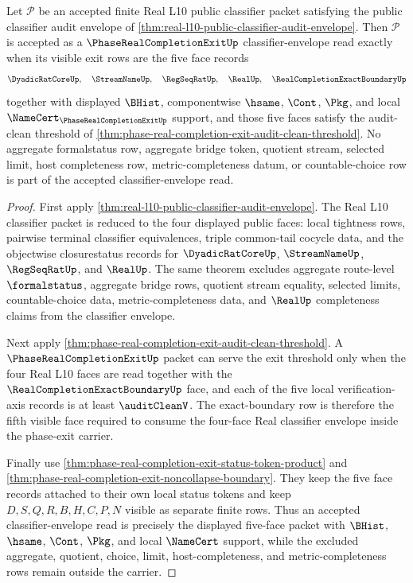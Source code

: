 \begin{theorem}
\label{thm:phase-real-completion-exit-classifier-envelope-admission}
Let $\mathcal P$ be an accepted finite Real L10 public classifier packet satisfying the public classifier audit envelope of \autoref{thm:real-l10-public-classifier-audit-envelope}. Then $\mathcal P$ is accepted as a $\PhaseRealCompletionExitUp$ classifier-envelope read exactly when its visible exit rows are the five face records
$$
\DyadicRatCoreUp,\quad \StreamNameUp,\quad \RegSeqRatUp,\quad \RealUp,\quad \RealCompletionExactBoundaryUp
$$
together with displayed $\BHist$, componentwise $\hsame$, $\Cont$, $\Pkg$, and local $\NameCert_{\PhaseRealCompletionExitUp}$ support, and those five faces satisfy the audit-clean threshold of \autoref{thm:phase-real-completion-exit-audit-clean-threshold}. No aggregate formalstatus row, aggregate bridge token, quotient stream, selected limit, host completeness row, metric-completeness datum, or countable-choice row is part of the accepted classifier-envelope read.
\end{theorem}
\begin{proof}
First apply \autoref{thm:real-l10-public-classifier-audit-envelope}. The Real L10 classifier packet is reduced to the four displayed public faces: local tightness rows, pairwise terminal classifier equivalences, triple common-tail cocycle data, and the objectwise closurestatus records for $\DyadicRatCoreUp$, $\StreamNameUp$, $\RegSeqRatUp$, and $\RealUp$. The same theorem excludes aggregate route-level $\formalstatus$, aggregate bridge rows, quotient stream equality, selected limits, countable-choice data, metric-completeness data, and $\RealUp$ completeness claims from the classifier envelope.

Next apply \autoref{thm:phase-real-completion-exit-audit-clean-threshold}. A $\PhaseRealCompletionExitUp$ packet can serve the exit threshold only when the four Real L10 faces are read together with the $\RealCompletionExactBoundaryUp$ face, and each of the five local verification-axis records is at least $\auditCleanV$. The exact-boundary row is therefore the fifth visible face required to consume the four-face Real classifier envelope inside the phase-exit carrier.

Finally use \autoref{thm:phase-real-completion-exit-status-token-product} and \autoref{thm:phase-real-completion-exit-noncollapse-boundary}. They keep the five face records attached to their own local status tokens and keep $D,S,Q,R,B,H,C,P,N$ visible as separate finite rows. Thus an accepted classifier-envelope read is precisely the displayed five-face packet with $\BHist$, $\hsame$, $\Cont$, $\Pkg$, and local $\NameCert$ support, while the excluded aggregate, quotient, choice, limit, host-completeness, and metric-completeness rows remain outside the carrier.
\end{proof}

